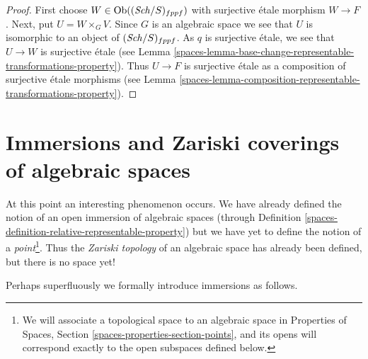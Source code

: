 \begin{proof}

First choose $W \in \operatorname{Ob}((\mathit{Sch}/S)_{fppf})$
with surjective \'etale morphism $W \to F$.
Next, put $U = W \times_G V$. Since $G$ is an algebraic space
we see that $U$ is isomorphic to an object of $(\mathit{Sch}/S)_{fppf}$.
As $q$ is surjective \'etale, we see that $U \to W$ is surjective
\'etale (see
Lemma \ref{spaces-lemma-base-change-representable-transformations-property}).
Thus $U \to F$ is surjective \'etale as a composition of surjective
\'etale morphisms (see
Lemma \ref{spaces-lemma-composition-representable-transformations-property}).
\end{proof}

\section{Immersions and Zariski coverings of algebraic spaces}
\label{spaces-section-Zariski}
At this point an interesting phenomenon occurs. We have already defined
the notion of an open immersion of algebraic spaces (through
Definition \ref{spaces-definition-relative-representable-property})
but we have yet to define the notion of a {\it point}\footnote{We
will associate a topological space to an algebraic space in
Properties of Spaces, Section
\ref{spaces-properties-section-points},
and its opens will correspond exactly to the open subspaces defined below.}.
Thus the {\it Zariski topology} of an algebraic space
has already been defined, but there is no space yet!

\medskip\noindent
Perhaps superfluously we formally introduce immersions as follows.

